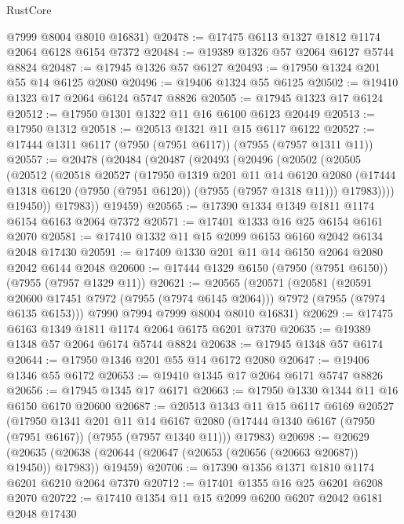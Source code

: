 \begin{lexlean}{RustCore}
\begin{coremodule}
      @7999
      @8004
      @8010
      @16831)
@20478 := @17475 @6113 @1327 @1812 @1174 @2064 @6128 @6154 @7372
@20484 := @19389 @1326 @57 @2064 @6127 @5744 @8824
@20487 := @17945 @1326 @57 @6127
@20493 := @17950 @1324 @201 @55 @14 @6125 @2080
@20496 := @19406 @1324 @55 @6125
@20502 := @19410 @1323 @17 @2064 @6124 @5747 @8826
@20505 := @17945 @1323 @17 @6124
@20512 := @17950 @1301 @1322 @11 @16 @6100 @6123 @20449
@20513 := @17950 @1312
@20518 := @20513 @1321 @11 @15 @6117 @6122
@20527 := @17444 @1311 @6117 (@7950 (@7951 @6117)) (@7955 (@7957 @1311 @11))
@20557 := @20478
    (@20484
      (@20487
        (@20493
          (@20496
            (@20502
              (@20505
                (@20512
                  (@20518
                    @20527
                    (@17950
                      @1319
                      @201
                      @11
                      @14
                      @6120
                      @2080
                      (@17444 @1318 @6120 (@7950 (@7951 @6120)) (@7955 (@7957 @1318 @11)))
                      @17983))))
              @19450))
          @17983))
      @19459)
@20565 := @17390 @1334 @1349 @1811 @1174 @6154 @6163 @2064 @7372
@20571 := @17401 @1333 @16 @25 @6154 @6161 @2070
@20581 := @17410 @1332 @11 @15 @2099 @6153 @6160 @2042 @6134 @2048 @17430
@20591 := @17409 @1330 @201 @11 @14 @6150 @2064 @2080 @2042 @6144 @2048
@20600 := @17444 @1329 @6150 (@7950 (@7951 @6150)) (@7955 (@7957 @1329 @11))
@20621 := @20565
    (@20571
      (@20581
        (@20591 @20600 @17451 @7972 (@7955 (@7974 @6145 @2064)))
        @7972
        (@7955 (@7974 @6135 @6153)))
      @7990
      @7994
      @7999
      @8004
      @8010
      @16831)
@20629 := @17475 @6163 @1349 @1811 @1174 @2064 @6175 @6201 @7370
@20635 := @19389 @1348 @57 @2064 @6174 @5744 @8824
@20638 := @17945 @1348 @57 @6174
@20644 := @17950 @1346 @201 @55 @14 @6172 @2080
@20647 := @19406 @1346 @55 @6172
@20653 := @19410 @1345 @17 @2064 @6171 @5747 @8826
@20656 := @17945 @1345 @17 @6171
@20663 := @17950 @1330 @1344 @11 @16 @6150 @6170 @20600
@20687 := @20513
    @1343
    @11
    @15
    @6117
    @6169
    @20527
    (@17950
      @1341
      @201
      @11
      @14
      @6167
      @2080
      (@17444 @1340 @6167 (@7950 (@7951 @6167)) (@7955 (@7957 @1340 @11)))
      @17983)
@20698 := @20629
    (@20635 (@20638 (@20644 (@20647 (@20653 (@20656 (@20663 @20687)) @19450)) @17983)) @19459)
@20706 := @17390 @1356 @1371 @1810 @1174 @6201 @6210 @2064 @7370
@20712 := @17401 @1355 @16 @25 @6201 @6208 @2070
@20722 := @17410 @1354 @11 @15 @2099 @6200 @6207 @2042 @6181 @2048 @17430

\end{coremodule}
\end{lexlean}
